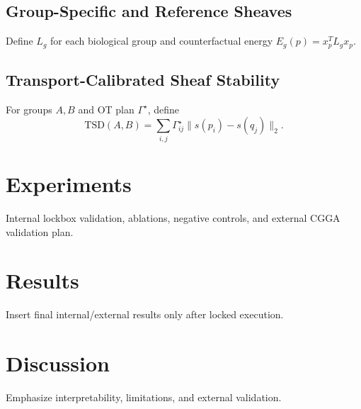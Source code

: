 \documentclass[conference]{IEEEtran}
\begin{document}
\subsection{Group-Specific and Reference Sheaves}
Define $L_g$ for each biological group and counterfactual energy $E_g(p)=x_p^T L_gx_p$.
\subsection{Transport-Calibrated Sheaf Stability}
For groups $A,B$ and OT plan $\Gamma^\star$, define
\begin{equation}
\mathrm{TSD}(A,B)=\sum_{i,j}\Gamma^\star_{ij}\|s(p_i)-s(q_j)\|_2.
\end{equation}
\section{Experiments}
Internal lockbox validation, ablations, negative controls, and external CGGA validation plan.
\section{Results}
Insert final internal/external results only after locked execution.
\section{Discussion}
Emphasize interpretability, limitations, and external validation.
\end{document}
